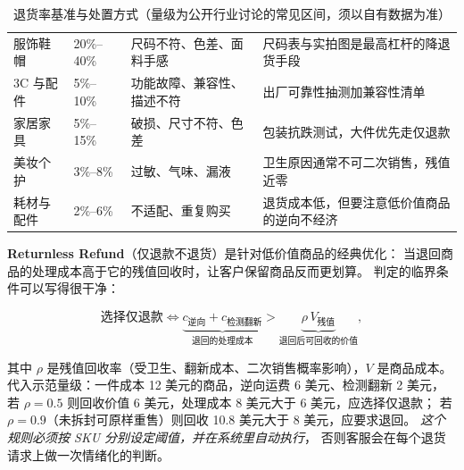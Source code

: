 \begin{table}[htbp]
\centering
\caption{退货率基准与处置方式（量级为公开行业讨论的常见区间，须以自有数据为准）}
\label{tab:sup-return}
\small
\begin{tabularx}{\textwidth}{L{2.4cm} C{2.2cm} L{3.4cm} Y}
\toprule
{} &  &  &  \\
\midrule
服饰鞋帽 & 20\%--40\% & 尺码不符、色差、面料手感 & 尺码表与实拍图是最高杠杆的降退货手段 \\
3C 与配件 & 5\%--10\% & 功能故障、兼容性、描述不符 & 出厂可靠性抽测加兼容性清单 \\
家居家具 & 5\%--15\% & 破损、尺寸不符、色差 & 包装抗跌测试，大件优先走仅退款 \\
美妆个护 & 3\%--8\% & 过敏、气味、漏液 & 卫生原因通常不可二次销售，残值近零 \\
耗材与配件 & 2\%--6\% & 不适配、重复购买 & 退货成本低，但要注意低价值商品的逆向不经济 \\
\bottomrule
\end{tabularx}
\end{table}

\textbf{Returnless Refund}（仅退款不退货）是针对低价值商品的经典优化：
当退回商品的处理成本高于它的残值回收时，让客户保留商品反而更划算。
判定的临界条件可以写得很干净：

\begin{equation}
\text{选择仅退款} \iff
\underbrace{c_{\text{逆向}} + c_{\text{检测翻新}}}_{\text{退回的处理成本}}
>
\underbrace{\rho\, V_{\text{残值}}}_{\text{退回后可回收的价值}} ,
\label{eq:return}
\end{equation}

其中 $\rho$ 是残值回收率（受卫生、翻新成本、二次销售概率影响），$V$ 是商品成本。
代入示范量级：一件成本 12 美元的商品，逆向运费 6 美元、检测翻新 2 美元，
若 $\rho = 0.5$ 则回收价值 6 美元，处理成本 8 美元大于 6 美元，应选择仅退款；
若 $\rho = 0.9$（未拆封可原样重售）则回收 10.8 美元大于 8 美元，应要求退回。
\emph{这个规则必须按 SKU 分别设定阈值，并在系统里自动执行}，
否则客服会在每个退货请求上做一次情绪化的判断。

